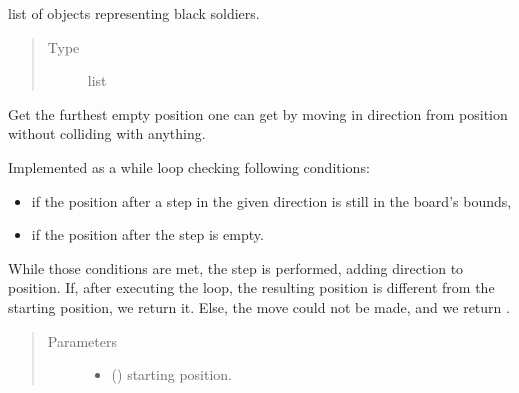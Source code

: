 \documentclass[letterpaper,10pt,english,openany,oneside]{sphinxmanual}
\begin{document}
\begin{fulllineitems}
\begin{fulllineitems}
\begin{quote}
\begin{description}
\end{description}\end{quote}

\end{fulllineitems}


\begin{fulllineitems}
\label{\detokenize{neutron:neutron.NeutronBoard.black_soldiers}}
list of {\hyperref[\detokenize{neutron:neutron.Soldier}]{}} objects representing black soldiers.
\begin{quote}\begin{description}
\item[{Type}] \leavevmode
list

\end{description}\end{quote}

\end{fulllineitems}


\begin{fulllineitems}
\label{\detokenize{neutron:neutron.NeutronBoard.furthest_empty_spot}}
Get the furthest empty position one can get by moving in direction
 from position  without colliding with anything.

Implemented as a while loop checking following conditions:
\begin{itemize}
\item {} 
if the position after a step in the given direction is still in
the board’s bounds,

\item {} 
if the position after the step is empty.

\end{itemize}

While those conditions are met, the step is performed, adding direction
to position.
If, after executing the loop, the resulting position is different from
the starting position, we return it. Else, the move could not be made,
and we return .
\begin{quote}\begin{description}
\item[{Parameters}] \leavevmode\begin{itemize}
\item {} 
 ({\hyperref[\detokenize{util:util.Vec}]{}}) \textendash{} starting position.


\end{itemize}
\end{description}
\end{quote}
\end{fulllineitems}
\end{fulllineitems}
\end{document}
